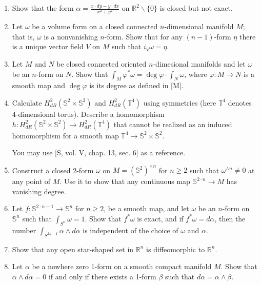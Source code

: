 \begin{enumerate}
\item Show that the form \(\alpha = \frac{x\cdot dy - y\cdot dx}{x^2+y^2}\) on \(\mathbb{R}^2\backslash \{0\}\) is closed but not exact.

\item Let \(\omega\) be a volume form on a closed connected \(n\)-dimensional manifold \(M\); that is, \(\omega\) is a nonvanishing \(n\)-form.
Show that for any \((n-1)\)-form \(\eta\) there is a unique vector field \(V\) on \(M\) such that \(i_V\omega=\eta\).

\item Let \(M\) and \(N\) be closed connected oriented \(n\)-dimesional manifolds
and let \(\omega\) be an \(n\)-form on \(N\).
Show that \(\int_M\varphi^*\omega=\deg\varphi\cdot\int_N\omega\), where \(\varphi\colon M\to N\) is a smooth map and \(\deg\varphi\) is its degree as defined in [M].

\item Calculate \(H^2_{dR}(\mathbb{S}^2\times \mathbb{S}^2)\) and \(H^2_{dR}(\mathbb{T}^4)\) using symmetries (here \(\mathbb{T}^4\) denotes 4-dimensional torus).
Describe a homomorphism \(h:H^2_{dR}(\mathbb{S}^2\times \mathbb{S}^2)\to H^2_{dR}(\mathbb{T}^4)\) that cannot be realized as an induced homomorphism for a smooth map \(\mathbb{T}^4\to \mathbb{S}^2\times \mathbb{S}^2\).

You may use [S, vol. V,  chap. 13, sec. 6] as a reference.

\item Construct a closed 2-form \(\omega\) on \(M = (\mathbb{S}^2)^{\times n}\) for \(n \geqslant 2\) such that \(\omega^{\wedge n} \not= 0\) at any point of \(M\).
Use it to show that any continuous map \(\mathbb{S}^{2\cdot n}\to M\) has vanishing degree.

\item Let \(f\colon \mathbb{S}^{2{\cdot}n-1}\to \mathbb{S}^n\) for \(n \geqslant 2\), be a smooth map, and let \(\omega\) be an \(n\)-form on \(\mathbb{S}^n\) such that \(\int_{S^n}\omega = 1\). Show that \(f^* \omega\) is exact, and if \(f^* \omega= d\alpha\), then the number
\(\int_{S^{2n-1}}\alpha\wedge d \alpha\)
is independent of the choice of \(\omega\) and \(\alpha\).

\item Show that any open star-shaped set in \(\mathbb{R}^n\) is diffeomorphic to \(\mathbb{R}^n\).

\item Let \(\alpha\) be a nowhere zero 1-form on a smooth compact manifold \(M\).
Show that \(\alpha\wedge d\alpha=0\) if and only if there exists a 1-form  \(\beta\) such that \(d\alpha= \alpha\wedge \beta\).


\end{enumerate}
